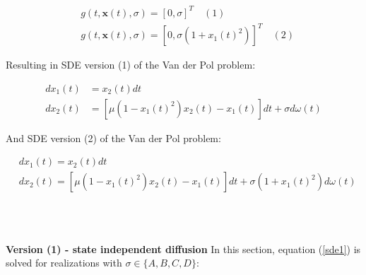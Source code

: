 \begin{align*}
    & g(t, \boldsymbol{x}(t), \sigma) = [0, \sigma]^T \quad (1) \\
    & g(t, \boldsymbol{x}(t), \sigma) = [0, \sigma (1 + x_1(t)^2)]^T \quad (2)
\end{align*}

Resulting in SDE version (1) of the Van der Pol problem:

\begin{equation}
\label{sde1}
\begin{aligned}
d x_{1}(t) &=x_{2}(t) d t \\
d x_{2}(t) &=\left[\mu\left(1-x_{1}(t)^{2}\right) x_{2}(t)-x_{1}(t)\right] d t+\sigma d \omega(t)
\end{aligned}
\end{equation}

And SDE version (2) of the Van der Pol problem:

\begin{equation}
\label{sde1}
\begin{aligned}
&d x_{1}(t)=x_{2}(t) d t \\
&d x_{2}(t)=\left[\mu\left(1-x_{1}(t)^{2}\right) x_{2}(t)-x_{1}(t)\right] d t+\sigma\left(1+x_{1}(t)^{2}\right) d \omega(t)
\end{aligned}
\end{equation}







\\\

\textbf{Version (1) - state independent diffusion}
In this section, equation (\ref{sde1}) is solved for realizations with $\sigma \in \{A,B,C,D\}$:

